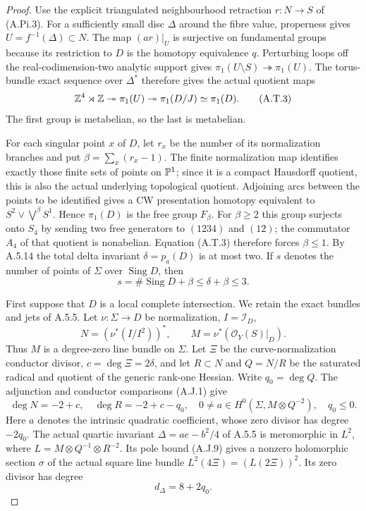 \begin{proof}
Use the explicit triangulated neighbourhood retraction
$r:N\to S$ of (A.Pi.3). For a sufficiently small disc
$\Delta$ around the fibre value, properness gives
$U=f^{-1}(\Delta)\subset N$. The map $(ar)|_U$ is
surjective on fundamental groups because its restriction
to $D$ is the homotopy equivalence $q$. Perturbing loops
off the real-codimension-two analytic support gives
$\pi_1(U\setminus S)\twoheadrightarrow\pi_1(U)$.
The torus-bundle exact sequence over $\Delta^*$ therefore
gives the actual quotient maps
\[
 \mathbb Z^4\rtimes\mathbb Z\twoheadrightarrow\pi_1(U)
       \twoheadrightarrow\pi_1(D/J)\simeq\pi_1(D).
                                                        \tag{A.T.3}
\]
The first group is metabelian, so the last is metabelian.

For each singular point $x$ of $D$, let $r_x$ be the
number of its normalization branches and put
$\beta=\sum_x(r_x-1)$. The finite normalization map
identifies exactly those finite sets of points on
$\mathbb P^1$; since it is a compact Hausdorff quotient,
this is also the actual underlying topological quotient.
Adjoining arcs between the points to be identified
gives a CW presentation homotopy equivalent to
$S^2\vee\bigvee^\beta S^1$. Hence
$\pi_1(D)$ is the free group $F_\beta$.
For $\beta\ge2$ this group surjects onto $S_4$ by
sending two free generators to $(1234)$ and $(12)$;
the commutator $A_4$ of that quotient is nonabelian.
Equation (A.T.3) therefore forces $\beta\le1$.
By A.5.14 the total delta invariant $\delta=p_a(D)$
is at most two. If $s$ denotes the number of points
of $\Sigma$ over $\operatorname{Sing}D$, then
\[
 s=\#\operatorname{Sing}D+\beta\le\delta+\beta\le3.
                                                        \tag{A.T.4}
\]

First suppose that $D$ is a local complete intersection.
We retain the exact bundles and jets of A.5.5.
Let $\nu:\Sigma\to D$ be normalization, $I=\mathcal I_D$,
\[
 N=(\nu^*(I/I^2))^*,\qquad
 M=\nu^*(\mathcal O_Y(S)|_D).
\]
Thus $M$ is a degree-zero line bundle on $\Sigma$.
Let $\Xi$ be the curve-normalization
conductor divisor, $c=\deg\Xi=2\delta$, and let
$R\subset N$ and $Q=N/R$ be the saturated radical and
quotient of the generic rank-one Hessian. Write
$q_0=\deg Q$. The adjunction and conductor comparisons
(A.J.1) give
\[
 \deg N=-2+c,\quad \deg R=-2+c-q_0,\quad
 0\ne a\in H^0(\Sigma,M\otimes Q^{-2}),\quad q_0\le0.
                                                        \tag{A.T.5}
\]
Here $a$ denotes the intrinsic quadratic coefficient,
whose zero divisor has degree $-2q_0$.
The actual quartic invariant $\Delta=ae-b^2/4$ of
A.5.5 is meromorphic in
$L^2$, where $L=M\otimes Q^{-1}\otimes R^{-2}$.
Its pole bound (A.J.9) gives a nonzero holomorphic
section $\sigma$ of the actual square line bundle
$L^2(4\Xi)=(L(2\Xi))^2$. Its zero divisor has degree
\[
               d_\Delta=8+2q_0.                    \tag{A.T.6}
\]


\end{proof}
